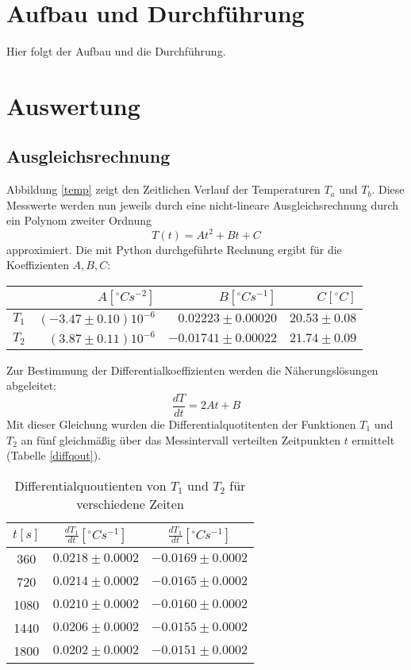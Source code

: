\documentclass[11pt]{article}
\begin{document}
\section{Aufbau und Durchf\"{u}hrung}
Hier folgt der Aufbau und die Durchführung.
\section{Auswertung}
\subsection{Ausgleichsrechnung}
Abbildung \ref{temp} zeigt den Zeitlichen Verlauf der Temperaturen $T_a$ und $T_b$. Diese Messwerte werden nun jeweils durch eine nicht-lineare Ausgleichsrechnung durch ein Polynom zweiter Ordnung
 \begin{equation}
T(t)= At^2+Bt+C 
 \end{equation}
 approximiert. Die mit Python durchgeführte Rechnung ergibt für die Koeffizienten $A, B, C$:
\begin{table}[h]
\centering

\begin{tabular}{l|r|r|r}
	 & $A [^\circ Cs^{-2}]$ & $B [^\circ Cs^{-1}]$ & $C [^\circ C]$ \\
\hline
$T_1$ & $(-3.47\pm0.10)10^{-6}$ & $0.02223\pm0.00020$ & $20.53\pm0.08$\\
$T_2$ & $(3.87\pm0.11)10^{-6}$ & $-0.01741\pm0.00022$ & $21.74\pm0.09$\\
\end{tabular}
\end{table}
Zur Bestimmung der Differentialkoeffizienten werden die Näherungslösungen abgeleitet:
\begin{equation}
\frac{dT}{dt} = 2At+B
\end{equation}
Mit dieser Gleichung wurden die Differentialquotitenten der Funktionen $T_1$ und $T_2$ an fünf gleichmäßig über das Messintervall verteilten Zeitpunkten $t$ ermittelt (Tabelle \ref{diffqout}).
\begin{table}[h]
\centering
\begin{tabular}{c|c|c}
$t [s]$ & $\frac{dT_1}{dt} [^\circ Cs^{-1}]$ & $\frac{dT_1}{dt}[^\circ Cs^{-1}]$\\
\hline
360  &$0.0218\pm0.0002$ & $-0.0169\pm0.0002$\\
720  &$0.0214\pm0.0002$ & $-0.0165\pm0.0002$\\
1080 &$0.0210\pm0.0002$ & $-0.0160\pm0.0002$\\
1440 &$0.0206\pm0.0002$ & $-0.0155\pm0.0002$\\
1800 &$0.0202\pm0.0002$ & $-0.0151\pm0.0002$\\
\end{tabular}
\label{diffquot}
\caption{Differentialquoutienten von $T_1$ und $T_2$ für verschiedene Zeiten}
\end{table}
\end{document}
